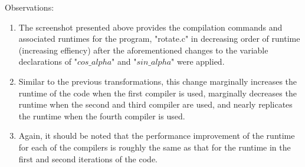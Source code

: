 \documentclass{article}
\begin{document}
Observations:
\begin{enumerate}
    \label{sec:math}
    \item The screenshot presented above provides the compilation commands and associated runtimes for the program, "rotate.c" in decreasing order of runtime (increasing effiency) after the aforementioned changes to the variable declarations of "$cos\_alpha$" and "$sin\_alpha$" were applied. 
    \item Similar to the previous transformations,  this change marginally increases the runtime of the code when the first compiler is used, marginally decreases the runtime when the second and third compiler are used, and nearly replicates the runtime when the fourth compiler is used.
    \item Again, it should be noted that the performance improvement of the runtime for each of the compilers is roughly the same as that for the runtime in the first and second iterations of the code. 
  
\end{enumerate}
\end{document}
